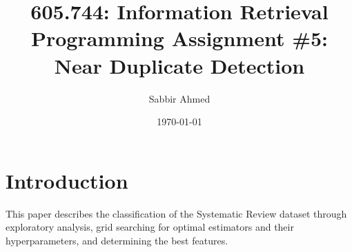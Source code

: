 \documentclass[11pt]{article}
\title{605.744: Information Retrieval \\ Programming Assignment \#5: Near Duplicate Detection}
\author{Sabbir Ahmed}
\date{\today}
\begin{document}
\maketitle
\tableofcontents
\clearpage
\newpage

\section{Introduction}
This paper describes the classification of the Systematic Review dataset through exploratory analysis, grid searching for optimal estimators and their hyperparameters, and determining the best features.







\end{document}
